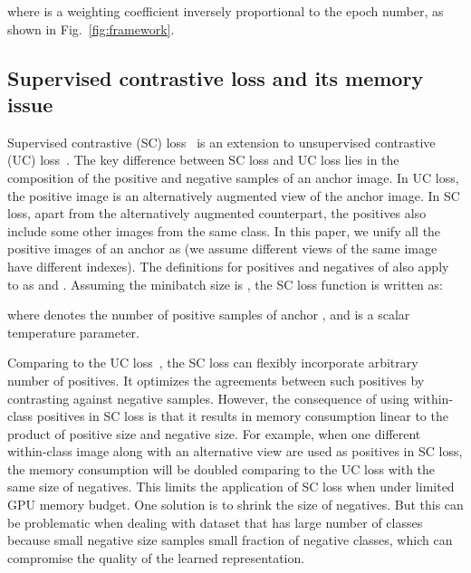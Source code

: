 \documentclass[final]{cvpr}
\begin{document}
where  is a weighting coefficient inversely proportional to the epoch number, as shown in Fig.~\ref{fig:framework}.

  
\subsection{Supervised contrastive loss and its memory issue}
Supervised contrastive (SC) loss~\cite{SC} is an extension to unsupervised contrastive (UC) loss~\cite{simclr}. The key difference between SC loss and UC loss lies in the composition of the positive and negative samples of an anchor image. In UC loss, the positive image is an alternatively augmented view of the anchor image. In SC loss, apart from the alternatively augmented counterpart, the positives also include some other images from the same class. In this paper, we unify all the positive images of an anchor  as  (we assume different views of the same image have different indexes). The definitions for positives and negatives of  also apply to  as  and . Assuming the minibatch size is , the SC loss function is written as:
  

where  denotes the number of positive samples of anchor , and  is a scalar temperature parameter.

Comparing to the UC loss~\cite{simclr}, the SC loss can flexibly incorporate arbitrary number of positives. It optimizes the agreements between such positives by contrasting against negative samples. However, the consequence of using within-class positives in SC loss is that it results in memory consumption linear to the product of positive size and negative size. For example, when one different within-class image along with an alternative view are used as positives in SC loss, the memory consumption will be doubled comparing to the UC loss with the same size of negatives. This limits the application of SC loss when under limited GPU memory budget. One solution is to shrink the size of negatives. But this can be problematic when dealing with dataset that has large number of classes because small negative size samples small fraction of negative classes, which can compromise the quality of the learned representation.  
\end{document}
